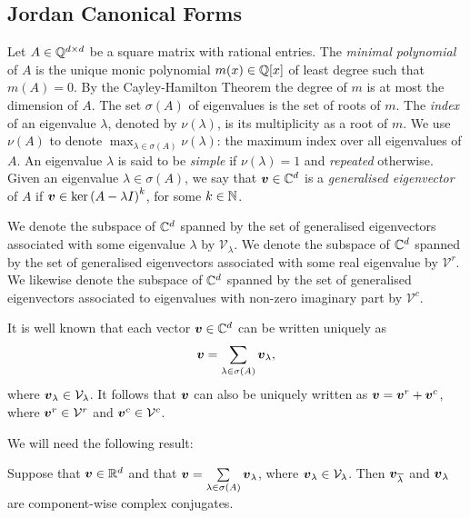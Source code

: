 \subsection{Jordan Canonical Forms}
\label{sec:jordan}

Let $A \in \mathbb{Q}^{d \times d}$ be a square matrix with rational
entries.
The \emph{minimal polynomial} of $A$ is the unique monic
polynomial $m(x) \in \mathbb{Q}[x]$ of least degree such that
$m(A)=0$.  By the Cayley-Hamilton Theorem the degree of $m$ is at most
the dimension of $A$. The set $\sigma(A)$ of eigenvalues is the set of
roots of $m$.
The \emph{index} of an eigenvalue $\lambda$, denoted
by $\nu(\lambda)$, is its multiplicity as a root of $m$. We
use $\nu(A)$ to denote $\max_{\lambda\in\sigma(A)} \nu(\lambda)$: the
maximum index over all eigenvalues of $A$. An eigenvalue $\lambda$ is said to be \emph{simple} if $\nu(\lambda) = 1$ and \emph{repeated} otherwise.
Given an eigenvalue $\lambda \in \sigma(A)$, we say that $\boldsymbol{v} \in \mathbb{C}^{d}$ is a \emph{generalised eigenvector} of $A$ if $\boldsymbol{v}\in \ker{(A-\lambda I)}^{k}$, for some $k\in\mathbb{N}$.

We denote the subspace of $\mathbb{C}^{d}$ spanned by the set of
generalised eigenvectors associated with some eigenvalue $\lambda$ by
$\mathcal{V}_{\lambda}$. We denote the subspace of $\mathbb{C}^{d}$
spanned by the set of generalised eigenvectors associated with some
real eigenvalue by $\mathcal{V}^{r}$.  We likewise denote the subspace
of $\mathbb{C}^{d}$ spanned by the set of generalised eigenvectors
associated to eigenvalues with non-zero imaginary part by
$\mathcal{V}^{c}$.

It is well known that each vector $\boldsymbol{v}\in\mathbb{C}^{d}$
can be written uniquely as
\begin{equation}
\label{eq:eigen-decomposition}
\myvector{v}=\displaystyle{
  \sum\limits_{\lambda\in\sigma(A)}\myvector{v}_{\lambda}},
\end{equation}
where $\boldsymbol{v}_{\lambda}\in\mathcal{V}_{\lambda}$.
It follows that $\boldsymbol{v}$ can also be uniquely written as
$\boldsymbol{v}=\boldsymbol{v}^{r}+\boldsymbol{v}^{c}$, where
$\boldsymbol{v}^{r} \in\mathcal{V}^{r}$ and
$\boldsymbol{v}^{c} \in\mathcal{V}^{c}$.

We will need the following result:
\begin{proposition}
\label{conj-relation}
Suppose that $\boldsymbol{v}\in\mathbb{R}^{d}$ and that $\boldsymbol{v}=\sum\limits_{\lambda\in\sigma(A)} \boldsymbol{v}_{\lambda}$, where $\boldsymbol{v}_{\lambda} \in\mathcal{V}_{\lambda}$. Then $\boldsymbol{v}_{\overline{\lambda}}$ and $\boldsymbol{v}_{\lambda}$ are component-wise complex conjugates.
\end{proposition}

